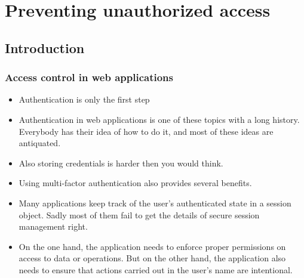 \documentclass[../main.tex]{subfiles}
\begin{document}
\chapter{Preventing unauthorized access}

\section{Introduction}
\subsection{Access control in web applications}
\begin{itemize}
\item Authentication is only the first step
\item Authentication in web applications is one of these topics with a long history. Everybody has their idea of how to do it, and most of these ideas are antiquated.
\item Also storing credentials is harder then you would think.
\item Using multi-factor authentication also provides several benefits.
\item Many applications keep track of the user's authenticated state in a session object. Sadly most of them fail to get the details of secure session management right.
\item On the one hand, the application needs to enforce proper permissions on access to data or operations. But on the other hand, the application also needs to ensure that actions carried out in the user's name are intentional.
\end{itemize}
\end{document}
